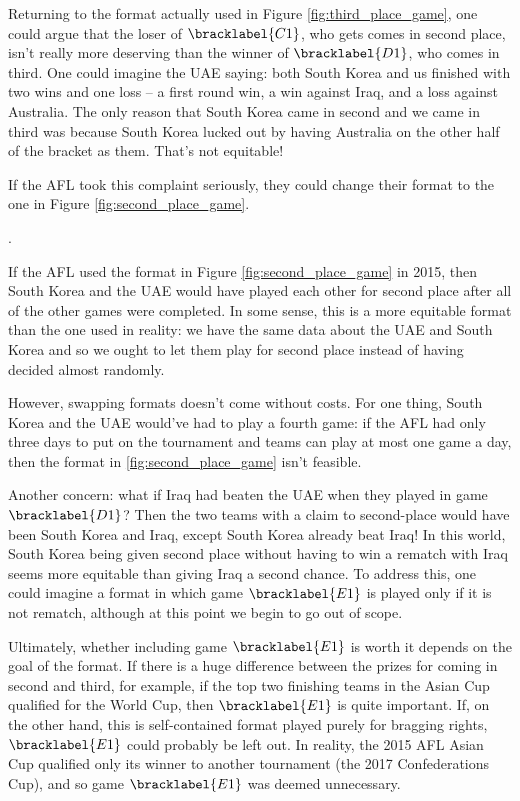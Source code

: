 {    Returning to the format actually used in Figure \ref{fig:third_place_game}, one could argue that the loser of $\bracklabel{C1}$, who gets comes in second place, isn't really more deserving than the winner of $\bracklabel{D1}$, who comes in third. One could imagine the UAE saying: both South Korea and us finished with two wins and one loss -- a first round win, a win against Iraq, and a loss against Australia. The only reason that South Korea came in second and we came in third was because South Korea lucked out by having Australia on the other half of the bracket as them. That's not equitable!

    If the AFL took this complaint seriously, they could change their format to the one in Figure \ref{fig:second_place_game}.

    .

    If the AFL used the format in Figure \ref{fig:second_place_game} in 2015, then South Korea and the UAE would have played each other for second place after all of the other games were completed. In some sense, this is a more equitable format than the one used in reality: we have the same data about the UAE and South Korea and so we ought to let them play for second place instead of having decided almost randomly.

    However, swapping formats doesn't come without costs. For one thing, South Korea and the UAE would've had to play a fourth game: if the AFL had only three days to put on the tournament and teams can play at most one game a day, then the format in \ref{fig:second_place_game} isn't feasible.

    Another concern: what if Iraq had beaten the UAE when they played in game $\bracklabel{D1}$? Then the two teams with a claim to second-place would have been South Korea and Iraq, except South Korea already beat Iraq! In this world, South Korea being given second place without having to win a rematch with Iraq seems more equitable than giving Iraq a second chance. To address this, one could imagine a format in which game $\bracklabel{E1}$ is played only if it is not rematch, although at this point we begin to go out of scope.

    Ultimately, whether including game $\bracklabel{E1}$ is worth it depends on the goal of the format. If there is a huge difference between the prizes for coming in second and third, for example, if the top two finishing teams in the Asian Cup qualified for the World Cup, then $\bracklabel{E1}$ is quite important. If, on the other hand, this is self-contained format played purely for bragging rights, $\bracklabel{E1}$ could probably be left out. In reality, the 2015 AFL Asian Cup qualified only its winner to another tournament (the 2017 Confederations Cup), and so game $\bracklabel{E1}$ was deemed unnecessary.

}
